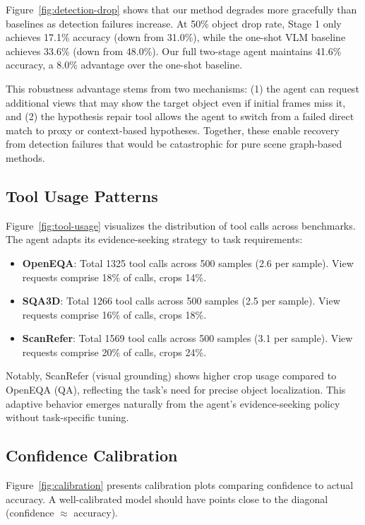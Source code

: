 Figure~\ref{fig:detection-drop} shows that our method degrades more gracefully than baselines as detection failures increase. At 50\% object drop rate, Stage 1 only achieves 17.1\% accuracy (down from 31.0\%), while the one-shot VLM baseline achieves 33.6\% (down from 48.0\%). Our full two-stage agent maintains 41.6\% accuracy, a 8.0\% advantage over the one-shot baseline.

This robustness advantage stems from two mechanisms: (1) the agent can request additional views that may show the target object even if initial frames miss it, and (2) the hypothesis repair tool allows the agent to switch from a failed direct match to proxy or context-based hypotheses. Together, these enable recovery from detection failures that would be catastrophic for pure scene graph-based methods.

\subsection{Tool Usage Patterns}

Figure~\ref{fig:tool-usage} visualizes the distribution of tool calls across benchmarks. The agent adapts its evidence-seeking strategy to task requirements:

\begin{itemize}
  \item \textbf{OpenEQA}: Total 1325 tool calls across 500 samples (2.6 per sample). View requests comprise 18\% of calls, crops 14\%.
  \item \textbf{SQA3D}: Total 1266 tool calls across 500 samples (2.5 per sample). View requests comprise 16\% of calls, crops 18\%.
  \item \textbf{ScanRefer}: Total 1569 tool calls across 500 samples (3.1 per sample). View requests comprise 20\% of calls, crops 24\%.
\end{itemize}

Notably, ScanRefer (visual grounding) shows higher crop usage compared to OpenEQA (QA), reflecting the task's need for precise object localization. This adaptive behavior emerges naturally from the agent's evidence-seeking policy without task-specific tuning.

\subsection{Confidence Calibration}

Figure~\ref{fig:calibration} presents calibration plots comparing confidence to actual accuracy. A well-calibrated model should have points close to the diagonal (confidence $\approx$ accuracy).


